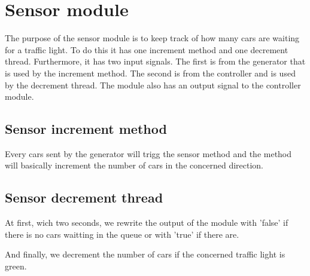\section{Sensor module}
The purpose of the sensor module is to keep track of how many cars are waiting for a traffic light. To do this it has one increment method and one decrement thread. Furthermore, it has two input signals. The first is from the generator that is used by the increment method. The second is from the controller and is used by the decrement thread. The module also has an output signal to the controller module.

\subsection{Sensor increment method}

Every cars sent by the generator will trigg the sensor method and the method will basically increment the number of cars in the concerned direction.   

\subsection{Sensor decrement thread}

At first, wich two seconds, we rewrite the output of the module with 'false' if there is no cars waitting in the queue or with 'true' if there are. 

And finally, we decrement the number of cars if the concerned traffic light is green. 
